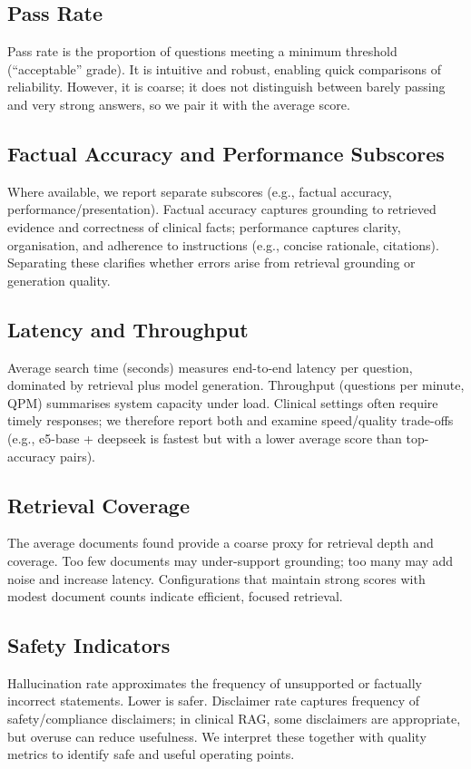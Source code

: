 \subsection{Pass Rate}
Pass rate is the proportion of questions meeting a minimum threshold (``acceptable'' grade). It is intuitive and robust, enabling quick comparisons of reliability. However, it is coarse; it does not distinguish between barely passing and very strong answers, so we pair it with the average score.

\subsection{Factual Accuracy and Performance Subscores}
Where available, we report separate subscores (e.g., factual accuracy, performance/presentation). Factual accuracy captures grounding to retrieved evidence and correctness of clinical facts; performance captures clarity, organisation, and adherence to instructions (e.g., concise rationale, citations). Separating these clarifies whether errors arise from retrieval grounding or generation quality.

\subsection{Latency and Throughput}
Average search time (seconds) measures end-to-end latency per question, dominated by retrieval plus model generation. Throughput (questions per minute, QPM) summarises system capacity under load. Clinical settings often require timely responses; we therefore report both and examine speed/quality trade-offs (e.g., e5-base + deepseek is fastest but with a lower average score than top-accuracy pairs).

\subsection{Retrieval Coverage}
The average documents found provide a coarse proxy for retrieval depth and coverage. Too few documents may under-support grounding; too many may add noise and increase latency. Configurations that maintain strong scores with modest document counts indicate efficient, focused retrieval.

\subsection{Safety Indicators}
Hallucination rate approximates the frequency of unsupported or factually incorrect statements. Lower is safer. Disclaimer rate captures frequency of safety/compliance disclaimers; in clinical RAG, some disclaimers are appropriate, but overuse can reduce usefulness. We interpret these together with quality metrics to identify safe and useful operating points.

